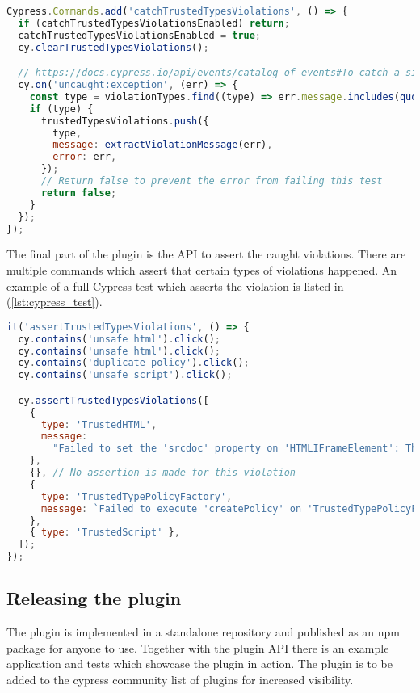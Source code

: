 \bigskip
\begin{lstlisting}[language=JavaScript, caption=Custom command to catch Trusted Types violations]
Cypress.Commands.add('catchTrustedTypesViolations', () => {
  if (catchTrustedTypesViolationsEnabled) return;
  catchTrustedTypesViolationsEnabled = true;
  cy.clearTrustedTypesViolations();

  // https://docs.cypress.io/api/events/catalog-of-events#To-catch-a-single-uncaught-exception
  cy.on('uncaught:exception', (err) => {
    const type = violationTypes.find((type) => err.message.includes(quote(type)));
    if (type) {
      trustedTypesViolations.push({
        type,
        message: extractViolationMessage(err),
        error: err,
      });
      // Return false to prevent the error from failing this test
      return false;
    }
  });
});
\end{lstlisting}

The final part of the plugin is the API to assert the caught violations. There are multiple commands
which assert that certain types of violations happened. An example of a full Cypress test which
asserts the violation is listed in (\ref{lst:cypress_test}).

\bigskip
\begin{lstlisting}[language=JavaScript, caption=Example Trusted Types violation test, label={lst:cypress_test}]
it('assertTrustedTypesViolations', () => {
  cy.contains('unsafe html').click();
  cy.contains('unsafe html').click();
  cy.contains('duplicate policy').click();
  cy.contains('unsafe script').click();

  cy.assertTrustedTypesViolations([
    {
      type: 'TrustedHTML',
      message:
        "Failed to set the 'srcdoc' property on 'HTMLIFrameElement': This document requires 'TrustedHTML' assignment.",
    },
    {}, // No assertion is made for this violation
    {
      type: 'TrustedTypePolicyFactory',
      message: `Failed to execute 'createPolicy' on 'TrustedTypePolicyFactory': Policy with name "my-policy" already exists.`,
    },
    { type: 'TrustedScript' },
  ]);
});
\end{lstlisting}

\subsection{Releasing the plugin}

The plugin is implemented in a standalone repository \cite{cypress-trusted-types:github} and
published as an npm package \cite{cypress-trusted-types:npm} for anyone to use. Together with the
plugin API there is an example application and tests which showcase the plugin in action. The plugin
is to be added to the cypress community list of plugins for increased visibility.

